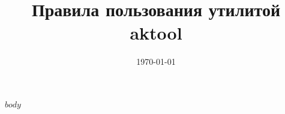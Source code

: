 \documentclass[a4paper, 12pt]{article}
\title{Правила пользования утилитой aktool}
\author{}
\date{\today}
\begin{document}
\maketitle
$body$
\end{document}
